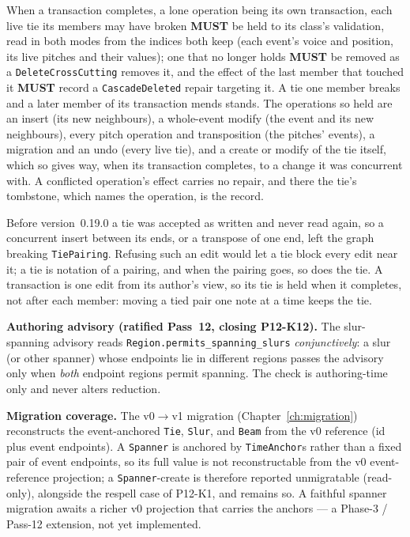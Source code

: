 \documentclass[11pt,letterpaper]{report}
\newcounter{requirement}[chapter]
\newcommand{\MUST}{\textbf{MUST}}
\begin{document}
\begin{requirement}
  \label{req:opcat:tie-gives-way}
  When a transaction completes, a lone operation being its own transaction,
  each live tie its members may have broken \MUST{} be held to its class's
  validation, read in both modes from the indices both keep (each event's
  voice and position, its live pitches and their values); one that no longer
  holds \MUST{} be removed as a \texttt{DeleteCrossCutting} removes it, and
  the effect of the last member that touched it \MUST{} record a
  \texttt{CascadeDeleted} repair targeting it. A tie one member breaks and a
  later member of its transaction mends stands. The operations so held are an
  insert (its new neighbours), a whole-event modify (the event and its new
  neighbours), every pitch operation and transposition (the pitches' events),
  a migration and an undo (every live tie), and a create or modify of the tie
  itself, which so gives way, when its transaction completes, to a change it
  was concurrent with. A conflicted operation's effect carries no repair, and
  there the tie's tombstone, which names the operation, is the record.
\end{requirement}

\begin{rationale}
  Before version~0.19.0 a tie was accepted as written and never read again,
  so a concurrent insert between its ends, or a transpose of one end, left the
  graph breaking \texttt{TiePairing}. Refusing such an edit would let a tie
  block every edit near it; a tie is notation of a pairing, and when the
  pairing goes, so does the tie. A transaction is one edit from its author's
  view, so its tie is held when it completes, not after each member: moving
  a tied pair one note at a time keeps the tie.
\end{rationale}

\textbf{Authoring advisory (ratified Pass~12, closing P12-K12).} The
slur-spanning advisory reads
\texttt{Region.permits\_spanning\_slurs} \emph{conjunctively}: a slur (or
other spanner) whose endpoints lie in different regions passes the advisory
only when \emph{both} endpoint regions permit spanning. The check is
authoring-time only and never alters reduction.

\textbf{Migration coverage.} The v0$\rightarrow$v1 migration
(Chapter~\ref{ch:migration}) reconstructs the event-anchored \texttt{Tie},
\texttt{Slur}, and \texttt{Beam} from the v0 reference (id plus event endpoints).
A \texttt{Spanner} is anchored by \texttt{TimeAnchor}s rather than a fixed pair
of event endpoints, so its full value is not reconstructable from the v0
event-reference projection; a \texttt{Spanner}-create is therefore reported
unmigratable (read-only), alongside the respell case of P12-K1, and remains so.
A faithful spanner migration awaits a richer v0 projection that carries the
anchors --- a Phase-3 / Pass-12 extension, not yet implemented.
\end{document}
